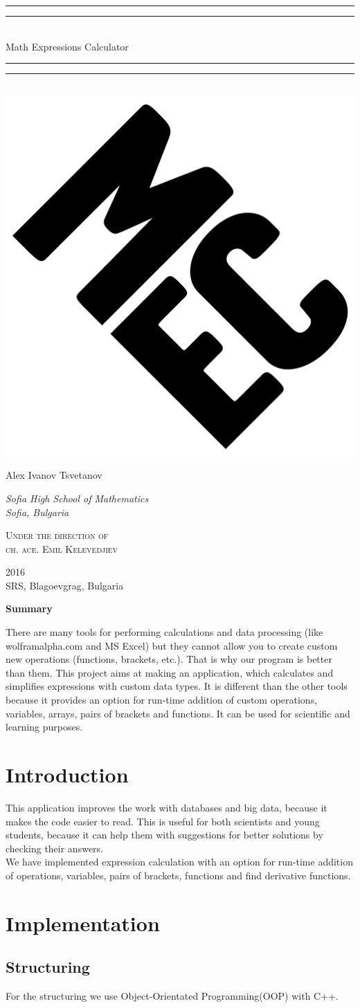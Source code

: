 \documentclass[12pt]{article}
\newcommand{\titleGP}{\begingroup
	\centering
	\vspace{\baselineskip}
	
	\rule{\textwidth}{1.6pt}\vspace{-\baselineskip}\vspace{2pt}
	\rule{\textwidth}{0.4pt}\\[\baselineskip]
	
	{\LARGE Math Expressions Calculator}\\[0.2\baselineskip]
	
	\rule{\textwidth}{0.4pt}\vspace{-\baselineskip}\vspace{3.2pt}
	\rule{\textwidth}{1.6pt}\\[\baselineskip] %
	
	\includegraphics[scale=0.5]{logo2.png}
	\\
	
	\vspace{50pt}
	{\LARGE Alex Ivanov Tsvetanov\\\par}
	{\itshape \Large Sofia High School of Mathematics \\ Sofia, Bulgaria\par}
	
	\vspace{2\baselineskip}
	
	{\scshape \large
	Under the direction of \\
	ch. ace. Emil Kelevedjiev \\\par
	}
	\vspace{1cm}
	
	
	\vfill
	
	{\scshape 2016} \\[0.3\baselineskip]
	{\large SRS, Blagoevgrag, Bulgaria }\par
	
	\endgroup}
\begin{document}
 
	
	\pagestyle{empty}
	
	\titleGP
	\newpage
	\tableofcontents
	\newpage

\begin{center}\LARGE \textbf{Summary}\end{center}
There are many tools for performing calculations and data processing (like wolframalpha.com and MS Excel) but they cannot allow you to create custom new operations (functions, brackets, etc.).
That is why our program is better than them.
This project aims at making an application, which calculates and simplifies expressions with custom data types. It is different than the other tools because it provides an option for run-time addition of custom operations, variables, arrays, pairs of brackets and functions. It can be used for scientific and learning purposes.

\section{Introduction}
This application improves the work with databases and big data, because it makes the code easier to read. This is useful for both scientists and young students, because it can help them with suggestions for better solutions by checking their answers. \\
We have implemented expression calculation with an option for run-time addition of operations, variables, pairs of brackets, functions and find derivative functions.

\section{Implementation}
	\subsection{Structuring}
	For the structuring we use Object-Orientated Programming(OOP) with C++. \\ \\
	{\small
	}
\end{document}
